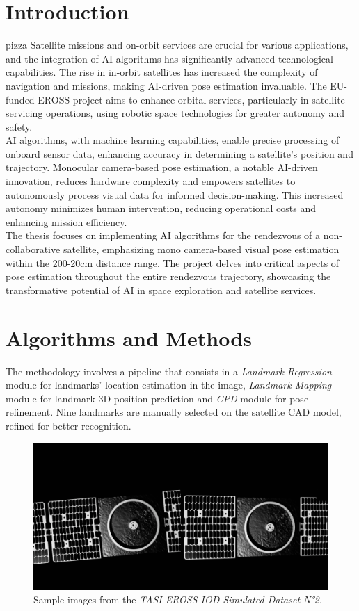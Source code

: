\section{Introduction}
pizza
Satellite missions and on-orbit services are crucial for various applications, and the integration of AI algorithms has significantly advanced technological capabilities. The rise in in-orbit satellites has increased the complexity of navigation and missions, making AI-driven pose estimation invaluable. The EU-funded EROSS project aims to enhance orbital services, particularly in satellite servicing operations, using robotic space technologies for greater autonomy and safety.\\
AI algorithms, with machine learning capabilities, enable precise processing of onboard sensor data, enhancing accuracy in determining a satellite's position and trajectory. Monocular camera-based pose estimation, a notable AI-driven innovation, reduces hardware complexity and empowers satellites to autonomously process visual data for informed decision-making. This increased autonomy minimizes human intervention, reducing operational costs and enhancing mission efficiency.\\
The thesis focuses on implementing AI algorithms for the rendezvous of a non-collaborative satellite, emphasizing mono camera-based visual pose estimation within the 200-20cm distance range. The project delves into critical aspects of pose estimation throughout the entire rendezvous trajectory, showcasing the transformative potential of AI in space exploration and satellite services.
\section{Algorithms and Methods}
The methodology involves a pipeline that consists in a \textit{Landmark Regression} module for landmarks' location estimation in the image, \textit{Landmark Mapping} module for  landmark 3D position prediction and \textit{CPD} module for pose refinement.
Nine landmarks are manually selected on the satellite CAD model, refined for better recognition.

\begin{figure}[htbp]
\centerline{\includegraphics[scale=0.32]{DatabaseExample.png}}
\caption{Sample images from the \textit{TASI EROSS IOD Simulated Dataset N°2}.}
\label{fig}
\end{figure}

